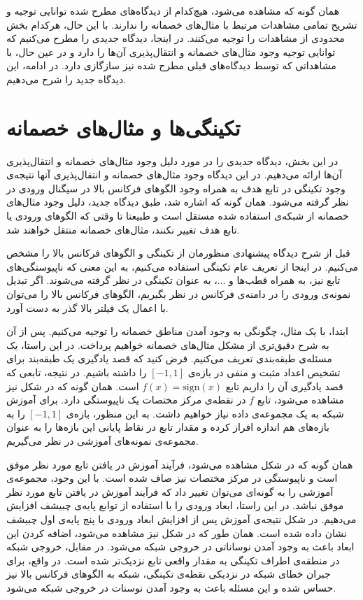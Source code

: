 \documentclass[12pt,onecolumn,a4paper]{article}
\begin{document}
همان گونه که مشاهده می‌شود، هیچ‌کدام از دیدگاه‌های مطرح شده توانایی توجیه و تشریح تمامی مشاهدات مرتبط با مثال‌های خصمانه را ندارند. با این حال، هرکدام بخش محدودی از مشاهدات را توجیه می‌کنند. در اینجا، دیدگاه جدیدی را مطرح می‌کنیم که توانایی توجیه وجود مثال‌های خصمانه و انتقال‌پذیری آن‌ها را دارد و  در عین حال، با مشاهداتی که توسط دیدگاه‌های قبلی مطرح شده نیز سازگازی دارد. در ادامه، این دیدگاه جدید را شرح می‌دهیم.

\section{تکینگی‌ها و مثال‌های خصمانه}
در این بخش، دیدگاه جدیدی را در مورد دلیل وجود مثال‌های خصمانه و انتقال‌پذیری آن‌ها ارائه می‌دهیم. در این دیدگاه وجود مثال‌های خصمانه و انتقال‌پذیری آنها نتیجه‌ی وجود تکینگی در تابع هدف به همراه وجود الگوهای فرکانس بالا در سیگنال ورودی در نظر گرفته می‌شود. همان گونه که اشاره شد، طبق دیدگاه جدید، دلیل وجود مثال‌های خصمانه از شبکه‌ی استفاده شده مستقل است و طبیعتا تا وقتی که الگوهای ورودی یا تابع هدف تغییر نکنند، مثال‌های خصمانه منتقل خواهند شد.

قبل از شرح دیدگاه پیشنهادی منظورمان از تکینگی و الگوهای فرکانس بالا را مشخص می‌کنیم. در اینجا از تعریف عام تکینگی استفاده می‌کنیم، به این معنی که ناپیوستگی‌های تابع نیز، به همراه قطب‌ها و ...، به عنوان تکینگی  در نظر گرفته می‌شوند. اگر تبدیل نمونه‌ی ورودی را در دامنه‌ی فرکانس در نظر بگیریم، الگوهای فرکانس بالا را می‌توان با اعمال یک  فیلتر بالا گذر به دست آورد.

ابتدا، با یک مثال، چگونگی به وجود آمدن مناطق خصمانه را توجیه می‌کنیم. پس از آن به شرح دقیق‌تری از مشکل مثال‌های خصمانه خواهیم پرداخت. در این راستا، یک مسئله‌ی طبقه‌بندی تعریف می‌کنیم. فرض کنید که قصد یادگیری یک طبقه‌بند برای تشخیص اعداد مثبت و منفی در بازه‌ی 
$[-1,1]$ 
را داشته باشیم. در نتیجه، تابعی که قصد یادگیری آن را داریم تابع 
$f(x)=\mathrm{sign}(x)$ 
است. همان گونه که در شکل نیز مشاهده می‌شود، تابع 
$f$ 
در نقطه‌ی مرکز مختصات یک ناپیوستگی دارد. برای آموزش شبکه به یک مجموعه‌ی داده نیاز خواهیم داشت. به این منظور، بازه‌ی 
$[-1,1]$ 
را به بازه‌های هم اندازه افراز کرده و مقدار تابع در نقاط پایانی این بازه‌ها را به عنوان مجموعه‌ی نمونه‌های آموزشی در نظر می‌گیریم.

همان گونه که در شکل مشاهده می‌شود، فرآیند آموزش در یافتن تابع مورد نظر موفق است و ناپیوستگی در مرکز مختصات نیز صاف شده است. با این وجود، مجموعه‌ی آموزشی را به گونه‌ای می‌توان تغییر داد که فرآیند آموزش در یافتن تابع مورد نظر موفق نباشد. در این راستا، ابعاد ورودی را با استفاده از توابع  پایه‌ی چبیشف افزایش می‌دهیم. در شکل نتیجه‌ی آموزش پس از افزایش ابعاد ورودی با پنج پایه‌ی اول چبیشف نشان داده شده است. همان طور که در شکل نیز مشاهده می‌شود، اضافه کردن این ابعاد باعث به وجود آمدن نوساناتی در خروجی شبکه می‌شود. در مقابل، خروجی شبکه در منطقه‌ی اطراف تکینگی به مقدار واقعی تابع نزدیک‌تر شده است. در واقع، برای جبران خطای شبکه در نزدیکی نقطه‌ی تکینگی، شبکه به الگوهای فرکانس بالا نیز حساس شده و این مسئله باعث به وجود آمدن نوسنات در خروجی شبکه می‌شود.
\end{document}

